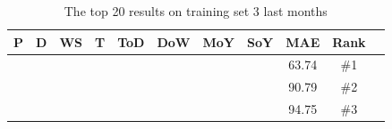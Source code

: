 \begin{table}[H]
\centering  %
\begin{tabular}{|c|c|c|c|c|c|c|c|c|c|c|} %
\hline
P & D & WS & T & ToD & DoW & MoY & SoY & MAE & Rank\\ [0.5ex] %
\hline
\x    & \x    & \x    & \x    & \x\m  & \x\m  & \x\m  &       & 63.74 & \#1 \\ \hline
\x    & \x    & \x    & \x    & \x\m  & \x\m  &       &       & 90.79 & \#2 \\ \hline
\x    & \x    & \x    & \x    & \x\m  & \x\m  &       & \x\m  & 94.75 & \#3 \\ \hline
\end{tabular}
\caption{The top 20 results on training set 3 last months} %
\label{table:1YearTrain} %
\end{table}

